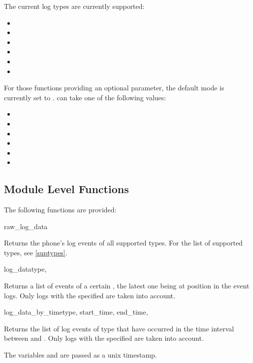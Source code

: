 The current log types are currently supported:
\label{suptypes}
\begin{itemize}
\item {}
\item {}
\item {}
\item {}
\item {}
\item {}
\end{itemize}

For those functions providing an optional  parameter, the default mode is currently set to
.  can take one of the following values:
\begin{itemize}
\item {}
\item {}
\item {}
\item {}
\item {}
\item {}
\end{itemize}

\subsection{Module Level Functions}
\label{subsec:logsmodule}
The following functions are provided:


\begin{funcdesc}{raw_log_data}{}

Returns the phone's log events of all supported types. For the list of supported types, see \ref{suptypes}.

\end{funcdesc}


\begin{funcdesc}{log_data}{type, }

Returns a list of  events of a certain , the latest one being at position
 in the event logs.
Only logs with the specified  are taken into account.

\end{funcdesc}


\begin{funcdesc}{log_data_by_time}{type, start_time, end_time, }

Returns the list of log events of type  that have occurred in the time interval
between  and .
Only logs with the specified  are taken into account.

The variables and  are passed as a unix timestamp.

\end{funcdesc}


